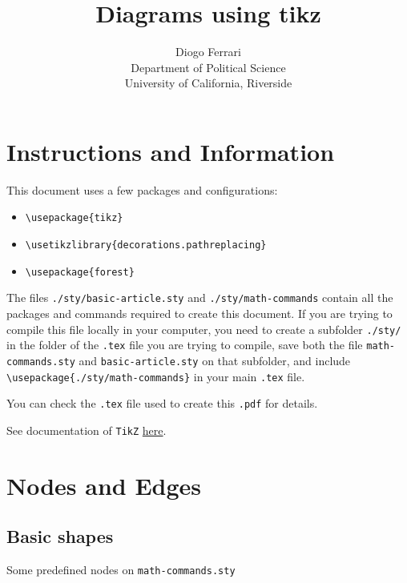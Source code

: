\documentclass[a4paper]{article}
\author{Diogo Ferrari\\
Department of Political Science\\
University of California, Riverside\\
}
\date{}
\title{Diagrams using tikz}
\begin{document}
\maketitle
\tableofcontents

\pagebreak
\section{Instructions and Information}
\label{sec:org85dfd10}

This document uses a few \Latex packages and configurations:
\begin{itemize}
\item \texttt{\textbackslash{}usepackage\{tikz\}}
\item \texttt{\textbackslash{}usetikzlibrary\{decorations.pathreplacing\}}
\item \texttt{\textbackslash{}usepackage\{forest\}}
\end{itemize}
The files \texttt{./sty/basic-article.sty} and \texttt{./sty/math-commands} contain all the packages and commands required to create this document. If you are trying to compile this file locally in your computer, you need to create a subfolder \texttt{./sty/} in the folder of the \texttt{.tex} file you are trying to compile, save both the file \texttt{math-commands.sty} and \texttt{basic-article.sty} on that subfolder, and include \texttt{\textbackslash{}usepackage\{./sty/math-commands\}} in your main \texttt{.tex} file.

You can check the \texttt{.tex} file used to create this \texttt{.pdf} for details.

See documentation of \texttt{TikZ} \href{https://ctan.org/pkg/pgf?lang=en}{here}. 


\pagebreak
\section{Nodes and Edges}
\label{sec:orgdda72dd}
\subsection{Basic shapes}
\label{sec:orgf05106d}
Some predefined nodes on \texttt{math-commands.sty}
\end{document}
